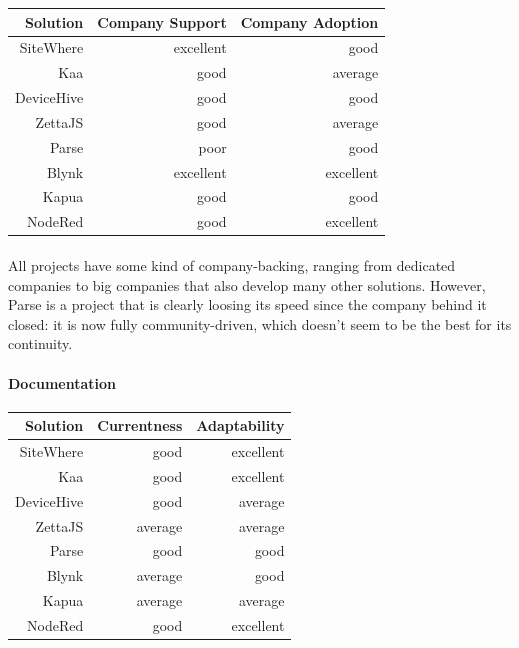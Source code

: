 \documentclass{article}
\begin{document}
\begin{center}
\begin{tabular}{r|r|r}
Solution & Company Support & Company Adoption \\ \hline
SiteWhere & \cellcolor{green!25}excellent & \cellcolor{blue!10}good \\
Kaa & \cellcolor{blue!10}good & \cellcolor{yellow!25}average \\
DeviceHive & \cellcolor{blue!10}good & \cellcolor{blue!10}good \\
ZettaJS & \cellcolor{blue!10}good & \cellcolor{yellow!25}average \\
Parse & \cellcolor{orange!25}poor & \cellcolor{blue!10}good \\
Blynk & \cellcolor{green!25}excellent & \cellcolor{green!25}excellent \\
Kapua & \cellcolor{blue!10}good & \cellcolor{blue!10}good \\
NodeRed & \cellcolor{blue!10}good & \cellcolor{green!25}excellent \\
\end{tabular}
\end{center}

\paragraph{} All projects have some kind of company-backing, ranging from dedicated companies to big companies that also develop many other solutions. However, Parse is a project that is clearly loosing its speed since the company behind it closed: it is now fully community-driven, which doesn't seem to be the best for its continuity.

\paragraph{Documentation}

\begin{center}
\begin{tabular}{r|r|r}
Solution & Currentness & Adaptability \\ \hline
SiteWhere & \cellcolor{blue!10}good & \cellcolor{green!25}excellent \\
Kaa & \cellcolor{blue!10}good & \cellcolor{green!25}excellent \\
DeviceHive & \cellcolor{blue!10}good & \cellcolor{yellow!25}average \\
ZettaJS & \cellcolor{yellow!25}average & \cellcolor{yellow!25}average \\
Parse & \cellcolor{blue!10}good & \cellcolor{blue!10}good \\
Blynk & \cellcolor{yellow!25}average & \cellcolor{blue!10}good \\
Kapua & \cellcolor{yellow!25}average & \cellcolor{yellow!25}average \\
NodeRed & \cellcolor{blue!10}good & \cellcolor{green!25}excellent \\
\end{tabular}
\end{center}
\end{document}
